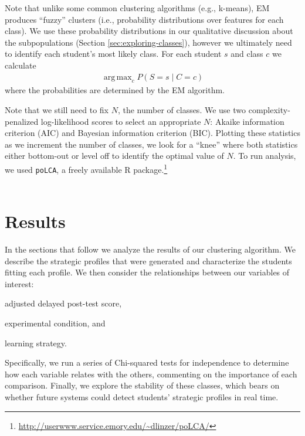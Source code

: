 \documentclass{edm_template}
\DeclareMathOperator*{\argmax}{arg\,max}
\begin{document}
Note that unlike some common clustering algorithms (e.g., k-means), EM produces ``fuzzy'' clusters (i.e., probability distributions over features for each class). We use these probability distributions in our qualitative discussion about the subpopulations (Section \ref{sec:exploring-classes}), however we ultimately need to identify each student's most likely class. For each student $s$ and class $c$ we calculate
\begin{align}
\argmax_{c} P(S = s \;|\; C = c)
\label{eqn:LCA-argmax}
\end{align}
where the probabilities are determined by the EM algorithm.

Note that we still need to fix $N$, the number of classes. We use two complexity-penalized log-likelihood scores to select an appropriate $N$: Akaike information criterion (AIC) and Bayesian information criterion (BIC). Plotting these statistics as we increment the number of classes, we look for a ``knee'' where both statistics either bottom-out or level off to identify the optimal value of $N$. To run analysis, we used \texttt{poLCA}, a freely available R package.\footnote{\url{http://userwww.service.emory.edu/~dlinzer/poLCA/}}
\\\\
\section{Results}
\label{sec:results}

In the sections that follow we analyze the results of our clustering algorithm. We describe the strategic profiles that were generated and characterize the students fitting each profile. We then consider the relationships between our variables of interest: 
\begin{inparaenum}[\itshape (a)]
\item adjusted delayed post-test score,
\item experimental condition, and
\item learning strategy.
\end{inparaenum}
Specifically, we run a series of Chi-squared tests for independence to determine how each variable relates with the others, commenting on the importance of each comparison. Finally, we explore the stability of these classes, which bears on whether future systems could detect students' strategic profiles in real time.
\end{document}
